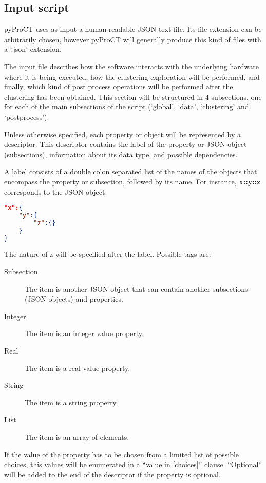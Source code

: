 \subsection{Input script}

pyProCT uses as input a human-readable JSON text file. Its file
extension can be arbitrarily chosen, however pyProCT will generally
produce this kind of files with a `.json' extension.

The input file describes how the software interacts with the underlying
hardware where it is being executed, how the clustering exploration
will be performed, and finally, which kind of post process operations
will be performed after the clustering has been obtained. This section
will be structured in 4 subsections, one for each of the main subsections
of the script (`global', `data', `clustering' and `postprocess').

Unless otherwise specified, each property or object will be represented
by a descriptor. This descriptor contains the label of the property
or JSON object (subsections), information about its data type, and
possible dependencies.

A label consists of a double colon separated list of the names of
the objects that encompass the property or subsection, followed by
its name. For instance, \textbf{x::y::z} corresponds to the JSON object:

\begin{lstlisting}[firstnumber=1,language=json,caption={Simple JSON object.}]
"x":{ 	
	"y":{
		"z":{}
	}
}
\end{lstlisting}

The nature of z will be specified after the label. Possible tags are: 

\begin{description}
	\item [{Subsection}] The item is another JSON object that can contain another
	subsections (JSON objects) and properties. 
	\item [{Integer}] The item is an integer value property. 
	\item [{Real}] The item is a real value property. 
	\item [{String}] The item is a string property. 
	\item [{List}] The item is an array of elements. 
\end{description}

If the value of the property has to be chosen from a limited list
of possible choices, this values will be enumerated in a ``value
in {[}choices{]}\textquotedblright{} clause. ``Optional\textquotedblright{}
will be added to the end of the descriptor if the property is optional.

